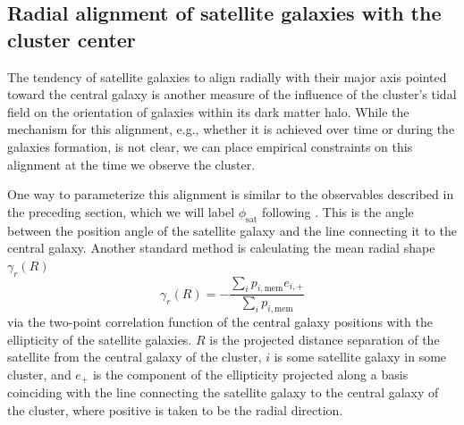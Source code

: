 \documentclass[fleqn,usenatbib]{mnras}
\begin{document}
\subsection{Radial alignment of satellite galaxies with the cluster center}\label{methodradial}

The tendency of satellite galaxies to align radially with their major axis pointed toward the central galaxy is another measure of the influence of the cluster's tidal field on the orientation of galaxies within its dark matter halo. While the mechanism for this alignment, e.g., whether it is achieved over time or during the galaxies formation, is not clear, we can place empirical constraints on this alignment at the time we observe the cluster. 

One way to parameterize this alignment is similar to the observables described in the preceding section, which we will label $\phi_{\mathrm{sat}}$ following \cite{Huang_2017}. This is the angle between the position angle of the satellite galaxy and the line connecting it to the central galaxy. Another standard method is calculating the mean radial shape $\gamma_r(R)$ 
\begin{equation}
\gamma_r(R) = -\frac{\sum_{i} p_{i,\mathrm{mem}} e_{i,+}}{\sum_{i} p_{i,\mathrm{mem}}}
\end{equation}
via the two-point correlation function of the central galaxy positions with the ellipticity of the satellite galaxies. $R$ is the projected distance separation of the satellite from the central galaxy of the cluster, $i$ is some satellite galaxy in some cluster, and $e_{+}$ is the component of the ellipticity projected along a basis coinciding with the line connecting the satellite galaxy to the central galaxy of the cluster, where positive is taken to be the radial direction.
\end{document}
